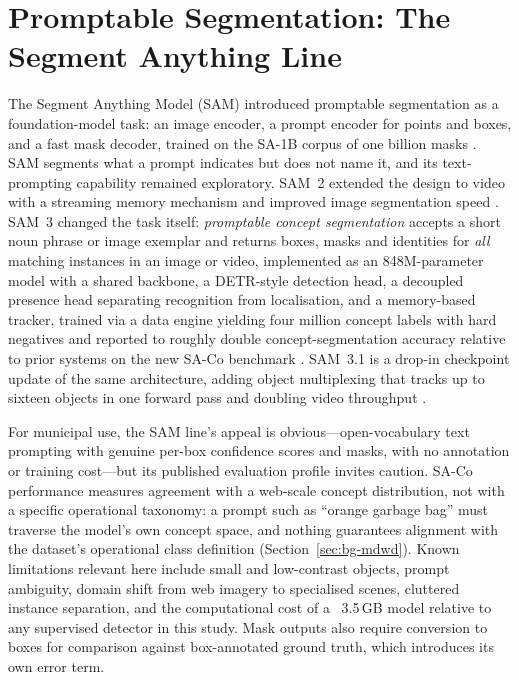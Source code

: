 \section{Promptable Segmentation: The Segment Anything Line}
\label{sec:lr-sam}

The Segment Anything Model (SAM) introduced promptable segmentation as a foundation-model task: an image encoder, a prompt encoder for points and boxes, and a fast mask decoder, trained on the SA-1B corpus of one billion masks \citep{kirillov2023segment}. SAM segments what a prompt indicates but does not name it, and its text-prompting capability remained exploratory. SAM~2 extended the design to video with a streaming memory mechanism and improved image segmentation speed \citep{ravi2024sam2}. SAM~3 changed the task itself: \emph{promptable concept segmentation} accepts a short noun phrase or image exemplar and returns boxes, masks and identities for \emph{all} matching instances in an image or video, implemented as an 848M-parameter model with a shared backbone, a DETR-style detection head, a decoupled presence head separating recognition from localisation, and a memory-based tracker, trained via a data engine yielding four million concept labels with hard negatives and reported to roughly double concept-segmentation accuracy relative to prior systems on the new SA-Co benchmark \citep{meta2025sam3}. SAM~3.1 is a drop-in checkpoint update of the same architecture, adding object multiplexing that tracks up to sixteen objects in one forward pass and doubling video throughput \citep{meta2026sam31}.

For municipal use, the SAM line's appeal is obvious---open-vocabulary text prompting with genuine per-box confidence scores and masks, with no annotation or training cost---but its published evaluation profile invites caution. SA-Co performance measures agreement with a web-scale concept distribution, not with a specific operational taxonomy: a prompt such as ``orange garbage bag'' must traverse the model's own concept space, and nothing guarantees alignment with the dataset's operational class definition (Section~\ref{sec:bg-mdwd}). Known limitations relevant here include small and low-contrast objects, prompt ambiguity, domain shift from web imagery to specialised scenes, cluttered instance separation, and the computational cost of a ~3.5\,GB model relative to any supervised detector in this study. Mask outputs also require conversion to boxes for comparison against box-annotated ground truth, which introduces its own error term.

